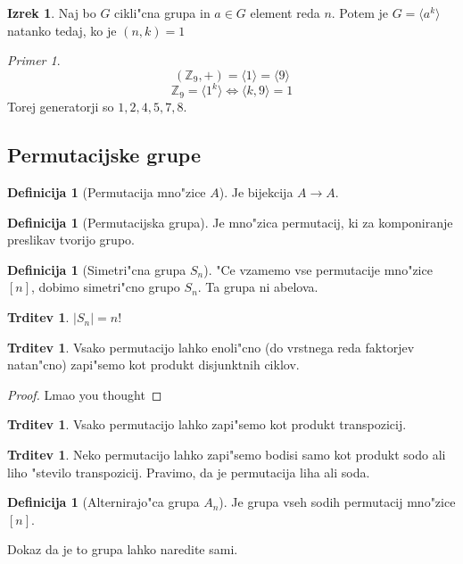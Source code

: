 \documentclass[11pt, a4paper]{article}
\theoremstyle{definition}
\newtheorem{defn}[counter]{Definicija}
\newtheorem{claim}[counter]{Trditev}
\newtheorem{theorem}[counter]{Izrek}
\theoremstyle{remark}
\newtheorem*{ex}{Primer}
\newcommand{\Z}{\mathbb{Z}}
\begin{document}
	\begin{theorem}
		Naj bo $G$ cikli"cna grupa in $a \in G$ element reda $n$. Potem je $G = \langle a^k \rangle$ natanko tedaj, ko je $(n,k) = 1$
	\end{theorem}
	\begin{ex}
		\[ (\Z_9, +) = \langle 1 \rangle = \langle 9 \rangle \]
		\[ \Z_9 = \langle 1^k \rangle \iff \langle k,9 \rangle = 1 \]
		Torej generatorji so $1, 2, 4, 5, 7, 8$.
	\end{ex}

	\subsection{Permutacijske grupe}
	\begin{defn}[Permutacija mno"zice $A$]
		Je bijekcija $A \rightarrow A$.
	\end{defn}
	
	\begin{defn}[Permutacijska grupa]
		Je mno"zica permutacij, ki za komponiranje preslikav tvorijo grupo.
	\end{defn}
	\begin{defn}[Simetri"cna grupa $S_n$]
		"Ce vzamemo vse permutacije mno"zice $[n]$, dobimo simetri"cno grupo $S_n$. Ta grupa ni abelova.
	\end{defn}
	\begin{claim}
		$|S_n| = n!$
	\end{claim}
		
	\begin{claim}
		Vsako permutacijo lahko enoli"cno (do vrstnega reda faktorjev natan"cno) zapi"semo kot produkt disjunktnih ciklov.
	\end{claim}
	\begin{proof}
		Lmao you thought
	\end{proof}
	\begin{claim}
		Vsako permutacijo lahko zapi"semo kot produkt transpozicij.
	\end{claim}

	\begin{claim}
		Neko permutacijo lahko zapi"semo bodisi samo kot produkt sodo ali liho "stevilo transpozicij. Pravimo, da je permutacija liha ali soda.
	\end{claim}

	\begin{defn}[Alternirajo"ca grupa $A_n$]
		Je grupa vseh sodih permutacij mno"zice $[n]$.
	\end{defn}
	Dokaz da je to grupa lahko naredite sami.
	
\end{document}
